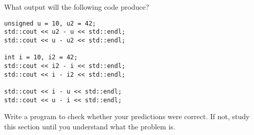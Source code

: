 %
%
\begin{question}
What output will the following code produce?
\begin{lstlisting}
unsigned u = 10, u2 = 42;
std::cout << u2 - u << std::endl;
std::cout << u - u2 << std::endl;

int i = 10, i2 = 42;
std::cout << i2 - i << std::endl;
std::cout << i - i2 << std::endl;

std::cout << i - u << std::endl;
std::cout << u - i << std::endl;
\end{lstlisting}
\end{question}

\begin{question}
Write a program to check whether your predictions were
correct. If not, study this section until you understand what the problem is.
\end{question}
